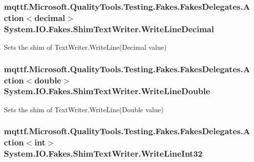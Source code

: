 \hypertarget{class_system_1_1_i_o_1_1_fakes_1_1_shim_text_writer_aaf686313273e152346a09de3490636c3}{
\subsubsection[{Write\-Line\-Decimal}]{\setlength{\rightskip}{0pt plus 5cm}mqttf.\-Microsoft.\-Quality\-Tools.\-Testing.\-Fakes.\-Fakes\-Delegates.\-Action$<$decimal$>$ System.\-I\-O.\-Fakes.\-Shim\-Text\-Writer.\-Write\-Line\-Decimal\hspace{0.3cm}{\ttfamily [set]}}}\label{class_system_1_1_i_o_1_1_fakes_1_1_shim_text_writer_aaf686313273e152346a09de3490636c3}


Sets the shim of Text\-Writer.\-Write\-Line(\-Decimal value)

\hypertarget{class_system_1_1_i_o_1_1_fakes_1_1_shim_text_writer_a384eef693161d4b12dc3ac78e259a483}{
\subsubsection[{Write\-Line\-Double}]{\setlength{\rightskip}{0pt plus 5cm}mqttf.\-Microsoft.\-Quality\-Tools.\-Testing.\-Fakes.\-Fakes\-Delegates.\-Action$<$double$>$ System.\-I\-O.\-Fakes.\-Shim\-Text\-Writer.\-Write\-Line\-Double\hspace{0.3cm}{\ttfamily [set]}}}\label{class_system_1_1_i_o_1_1_fakes_1_1_shim_text_writer_a384eef693161d4b12dc3ac78e259a483}


Sets the shim of Text\-Writer.\-Write\-Line(\-Double value)

\hypertarget{class_system_1_1_i_o_1_1_fakes_1_1_shim_text_writer_a51907b94ab5c683cbe0dda4327e7f590}{
\subsubsection[{Write\-Line\-Int32}]{\setlength{\rightskip}{0pt plus 5cm}mqttf.\-Microsoft.\-Quality\-Tools.\-Testing.\-Fakes.\-Fakes\-Delegates.\-Action$<$int$>$ System.\-I\-O.\-Fakes.\-Shim\-Text\-Writer.\-Write\-Line\-Int32\hspace{0.3cm}{\ttfamily [set]}}}\label{class_system_1_1_i_o_1_1_fakes_1_1_shim_text_writer_a51907b94ab5c683cbe0dda4327e7f590}


